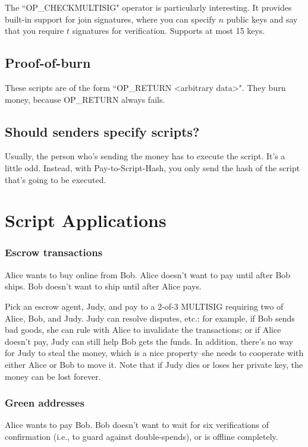 \documentclass[12pt]{article}
\begin{document}
The ``OP\_CHECKMULTISIG" operator is particularly interesting. It provides built-in support for join signatures, where you can specify $n$ public keys and say that you require $t$ signatures for verification. Supports at most 15 keys.

\subsection*{Proof-of-burn}

These scripts are of the form ``OP\_RETURN <arbitrary data>". They burn money, because OP\_RETURN always fails.

\subsection*{Should senders specify scripts?}

Usually, the person who's sending the money has to execute the script. It's a little odd. Instead, with Pay-to-Script-Hash, you only send the hash of the script that's going to be executed.

\section*{Script Applications}

\subsubsection*{Escrow transactions}

Alice wants to buy online from Bob. Alice doesn't want to pay until after Bob ships. Bob doesn't want to ship until after Alice pays.

Pick an escrow agent, Judy, and pay to a 2-of-3 MULTISIG requiring two of Alice, Bob, and Judy. Judy can resolve disputes, etc.: for example, if Bob sends bad goods, she can rule with Alice to invalidate the transactions; or if Alice doesn't pay, Judy can still help Bob gets the funds. In addition, there's no way for Judy to steal the money, which is a nice property--she needs to cooperate with either Alice or Bob to move it. Note that if Judy dies or loses her private key, the money can be lost forever.

\subsubsection*{Green addresses}

Alice wants to pay Bob. Bob doesn't want to wait for six verifications of confirmation (i.e., to guard against double-spends), or is offline completely.
\end{document}
